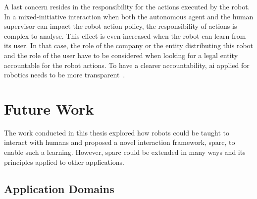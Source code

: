 A last concern resides in the responsibility for the actions executed by the robot. In a mixed-initiative interaction when both the autonomous agent and the human supervisor can impact the robot action policy, the responsibility of actions is complex to analyse. This effect is even increased when the robot can learn from its user. In that case, the role of the company or the entity distributing this robot and the role of the user have to be considered when looking for a legal entity accountable for the robot actions. To have a clearer accountability, \gls{ai} applied for robotics needs to be more transparent~\citep{wachter2017transparent}.

\section{Future Work}
The work conducted in this thesis explored how robots could be taught to interact with humans and proposed a novel interaction framework, \gls{sparc}, to enable such a learning. However, \gls{sparc} could be extended in many ways and its principles applied to other applications.

\subsection{Application Domains}


